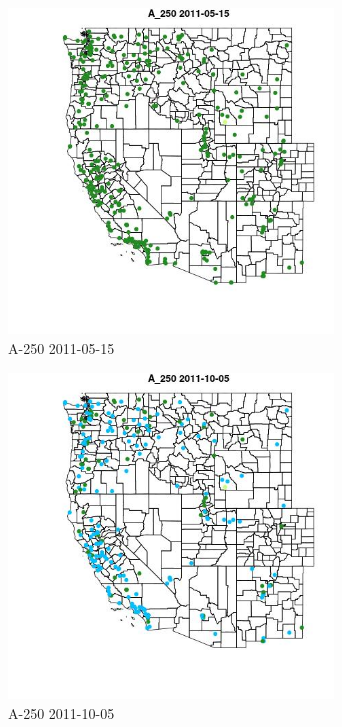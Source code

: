 \begin{figure} 
\centering  
\includegraphics[width=0.77\textwidth]{Code_Outputs/ML_input_report_ML_input_PM25_Step5_part_d_de_duplicated_aves_ML_input_MapObsA_2502011-05-15.jpg} 
\caption{\label{fig:ML_input_report_ML_input_PM25_Step5_part_d_de_duplicated_aves_ML_inputMapObsA_2502011-05-15}A-250 2011-05-15} 
\end{figure} 
 

\begin{figure} 
\centering  
\includegraphics[width=0.77\textwidth]{Code_Outputs/ML_input_report_ML_input_PM25_Step5_part_d_de_duplicated_aves_ML_input_MapObsA_2502011-10-05.jpg} 
\caption{\label{fig:ML_input_report_ML_input_PM25_Step5_part_d_de_duplicated_aves_ML_inputMapObsA_2502011-10-05}A-250 2011-10-05} 
\end{figure} 
 

